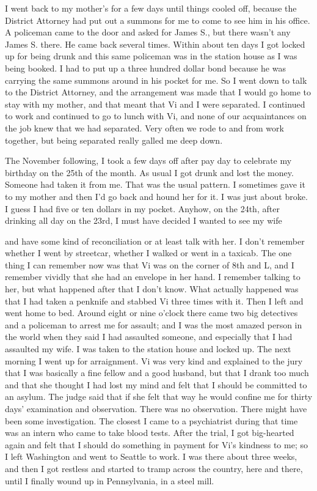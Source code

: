 \begin{biblechapter}
I went back to my mother’s for a few days until things cooled off, because the District Attorney had put out a summons for me to come to see him in his office. A policeman came to the door and asked for James S., but there wasn’t any James S. there. He came back several times. Within about ten days I got locked up for being drunk and this same policeman was in the station house as I was being booked. I had to put up a three hundred dollar bond because he was carrying the same summons around in his pocket for me. So I went down to talk to the District Attorney, and the arrangement was made that I would go home to stay with my mother, and that meant that Vi and I were separated. I continued to work and continued to go to lunch with Vi, and none of our acquaintances on the job knew that we had separated. Very often we rode to and from work together, but being separated really galled me deep down.

The November following, I took a few days off after pay day to celebrate my birthday on the 25th of the month. As usual I got drunk and lost the money. Someone had taken it from me. That was the usual pattern. I sometimes gave it to my mother and then I’d go back and hound her for it. I was just about broke. I guess I had five or ten dollars in my pocket. Anyhow, on the 24th, after drinking all day on the 23rd, I must have decided I wanted to see my wife

and have some kind of reconciliation or at least talk with her. I don’t remember whether I went by streetcar, whether I walked or went in a taxicab. The one thing I can remember now was that Vi was on the corner of 8th and L, and I remember vividly that she had an envelope in her hand. I remember talking to her, but what happened after that I don’t know. What actually happened was that I had taken a penknife and stabbed Vi three times with it. Then I left and went home to bed. Around eight or nine o’clock there came two big detectives and a policeman to arrest me for assault; and I was the most amazed person in the world when they said I had assaulted someone, and especially that I had assaulted my wife. I was taken to the station house and locked up. The next morning I went up for arraignment. Vi was very kind and explained to the jury that I was basically a fine fellow and a good husband, but that I drank too much and that she thought I had lost my mind and felt that I should be committed to an asylum. The judge said that if she felt that way he would confine me for thirty days’ examination and observation. There was no observation. There might have been some investigation. The closest I came to a psychiatrist during that time was an intern who came to take blood tests. After the trial, I got big-hearted again and felt that I should do something in payment for Vi’s kindness to me; so I left Washington and went to Seattle to work. I was there about three weeks, and then I got restless and started to tramp across the country, here and there, until I finally wound up in Pennsylvania, in a steel mill.


\end{biblechapter}

